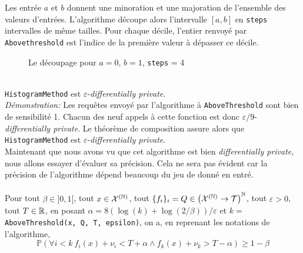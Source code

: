 Les entrée \(a\) et \(b\) donnent une minoration et une majoration de l'ensemble des valeurs d'entrées. L'algorithme découpe alors l'intervalle \([a,b]\) en \texttt{steps} intervalles de même tailles. Pour chaque décile, l'entier renvoyé par \texttt{Abovethreshold} est l'indice de la première valeur à dépasser ce décile.  


\begin{figure}[H]
    \centering
    \caption{Le découpage pour \(a = 0\), \(b = 1\), \texttt{steps} = 4}
\end{figure}

\theoreme{}\\
\texttt{HistogramMethod} est \(\varepsilon\)-\textit{differentially private}.\\


\textit{Démonstration:} Les requêtes envoyé par l'algorithme à \texttt{AboveThreshold} sont bien de sensibilité 1. Chacun des neuf appels à cette fonction est donc \(\varepsilon/9\)-\textit{differentially private}. Le théorème de composition assure alors que \texttt{HistogramMethod} est \(\varepsilon\)-\textit{differentially private}.\\

Maintenant que nous avons vu que cet algorithme est bien \textit{differentially private}, nous allons essayer d'évaluer sa précision. Cela ne sera pas évident car la précision de l'algorithme dépend beaucoup du jeu de donné en entré.\\




\\
Pour tout \(\beta \in ]0,1[\), tout \(x \in \mathcal X^{(\mathbb{N})}\), tout \(\{f_i\}_i = Q \in \left( \mathcal X^{(\mathbb{N})} \to  \mathcal T \right)^{\mathbb{N}}\), tout \(\varepsilon > 0\), tout \(T \in \mathbb{R}\),  en posant \(\alpha = 8\left( \log(k) + \log(2/\beta) \right)/\varepsilon\) et \(k = \) \texttt{AboveThreshold(x, Q, T, epsilon)}, on a, en reprenant les notations de l'algorithme,
\[
    \mathbb P \left( \forall i < k \  f_i(x) + \nu_i < T + \alpha \wedge f_k(x) + \nu_k > T - \alpha \right) \geq 1 - \beta
\]

